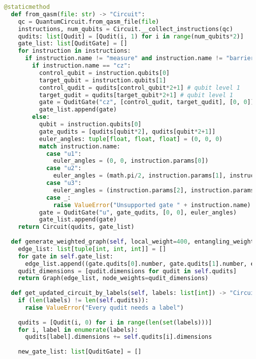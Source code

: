 \begin{lstlisting}[language=Python,caption=\texttt{circuit.py},label=lst:circuit.py]
  @staticmethod
  def from_qasm(file: str) -> "Circuit":
    qc = QuantumCircuit.from_qasm_file(file)
    instructions, num_qubits = Circuit.__collect_instructions(qc)
    qudits: list[Qudit] = [Qudit(i, 1) for i in range(num_qubits*2)]
    gate_list: list[QuditGate] = []
    for instruction in instructions:
      if instruction.name != "measure" and instruction.name != "barrier":
        if instruction.name == "cz":
          control_qubit = instruction.qubits[0]
          target_qubit = instruction.qubits[1]
          control_qudit = qudits[control_qubit*2+1] # qubit level 1
          target_qudit = qudits[target_qubit*2+1] # qubit level 1
          gate = QuditGate("cz", [control_qudit, target_qudit], [0, 0])
          gate_list.append(gate)
        else:
          qubit = instruction.qubits[0]
          gate_qudits = [qudits[qubit*2], qudits[qubit*2+1]]
          euler_angles: tuple[float, float, float] = (0, 0, 0)
          match instruction.name:
            case "u1":
              euler_angles = (0, 0, instruction.params[0])
            case "u2":
              euler_angles = (math.pi/2, instruction.params[1], instruction.params[0])
            case "u3":
              euler_angles = (instruction.params[2], instruction.params[1], instruction.params[0])
            case _:
              raise ValueError("Unsupported gate " + instruction.name)
          gate = QuditGate("u", gate_qudits, [0, 0], euler_angles)
          gate_list.append(gate)
    return Circuit(qudits, gate_list)
  
  def generate_weighted_graph(self, local_weight=400, entangling_weight=100) -> Graph:
    edge_list: list[tuple[int, int, int]] = []
    for gate in self.gate_list:
      edge_list.append((gate.qudits[0].number, gate.qudits[1].number, entangling_weight if gate.name == "cz" else local_weight))
    qudit_dimensions = [qudit.dimensions for qudit in self.qudits]
    return Graph(edge_list, node_weights=qudit_dimensions)
  
  def get_updated_circuit_by_labels(self, labels: list[int]) -> "Circuit":
    if (len(labels) != len(self.qudits)):
      raise ValueError("Every qudit needs a label")
    
    qudits = [Qudit(i, 0) for i in range(len(set(labels)))]
    for i, label in enumerate(labels):
      qudits[label].dimensions += self.qudits[i].dimensions
    
    new_gate_list: list[QuditGate] = []


\end{lstlisting}
